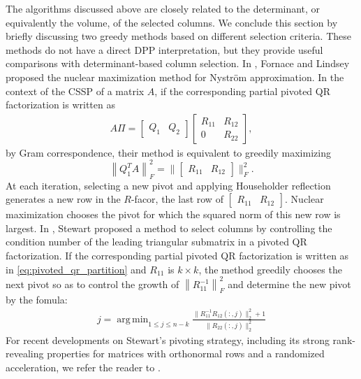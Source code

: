 \documentclass[11pt]{article}
\newcommand{\be}{\begin{eqnarray}}
\newcommand{\ee}{\end{eqnarray}}
\newcommand{\<}{\langle}
\renewcommand{\>}{\rangle}
\DeclareMathOperator*{\argmin}{arg\,min}
\begin{document}
The algorithms discussed above are closely related to the determinant, or equivalently the volume, of the selected columns. We conclude this section by briefly discussing two greedy methods based on different selection criteria. These methods do not have a direct DPP interpretation, but they provide useful comparisons with determinant-based column selection.
In \cite{fornace2024columnrowsubsetselection}, Fornace and Lindsey proposed the nuclear maximization method for Nystr\"{o}m approximation. In the context of the CSSP of a matrix $A$, if the corresponding partial pivoted QR factorization is written as
\be
\label{eq:pivoted_qr_partition}
A\Pi = \begin{bmatrix} Q_1 & Q_2 \end{bmatrix} \begin{bmatrix} R_{11} & R_{12} \\ 0 & R_{22} \end{bmatrix},
\ee
by Gram correspondence, their method is equivalent to greedily maximizing 
\[
\left\|Q_1^TA\right\|_F^2 = \|\begin{bmatrix}
    R_{11} & R_{12}
\end{bmatrix}\|_F^2.
\]
At each iteration, selecting a new pivot and applying Householder reflection generates a new row in the $R$-facor, the last row of $\begin{bmatrix}
    R_{11} & R_{12}
\end{bmatrix}$. Nuclear maximization chooses the pivot for which the squared norm of this new row is largest.
In \cite{Stewart1990Incremental}, Stewart proposed a method to select columns by controlling the condition number of the leading triangular submatrix in a pivoted QR factorization. If the corresponding partial pivoted QR factorization is written as in \eqref{eq:pivoted_qr_partition} and $R_{11}$ is $k\times k$, the method greedily chooses the next pivot so as to control the growth of $\left\|R_{11}^{-1}\right\|_F^2$ and determine the new pivot by the fomula:
\be
j = \argmin_{1\leq j\leq n-k} \frac{\|R_{11}^{-1}R_{12}(:,j) \|_2^2 + 1}{\|R_{22}(:,j)\|_2^2}
\ee
For recent developments on Stewart's pivoting strategy, including its strong rank-revealing properties for matrices with orthonormal rows and a randomized acceleration, we refer the reader to \cite{damle2026}.
\end{document}
